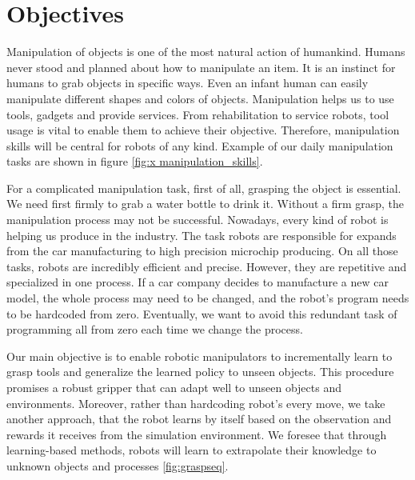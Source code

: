 \section{Objectives}

Manipulation of objects is one of the most natural action of humankind. Humans never stood and planned about how to manipulate an item. It is an instinct for humans to grab objects in specific ways. Even an infant human can easily manipulate different shapes and colors of objects. Manipulation helps us to use tools, gadgets and provide services. From rehabilitation to service robots, tool usage is vital to enable them to achieve their objective.
Therefore, manipulation skills will be central for robots of any kind. 
Example of our daily manipulation tasks are shown in figure \ref{fig:x manipulation_skills}.

For a complicated manipulation task, first of all, grasping the object is essential. We need first firmly to grab a water bottle to drink it.
Without a firm grasp, the manipulation process may not be successful. 
Nowadays, every kind of robot is helping us produce in the industry. The task robots are responsible for expands from the car manufacturing to high precision microchip producing. On all those tasks, robots are incredibly efficient and precise. However, they are repetitive and specialized in one process. If a car company decides to manufacture a new car model, the whole process may need to be changed, and the robot's program needs to be hardcoded from zero. Eventually, we want to avoid this redundant task of programming all from zero each time we change the process.

Our main objective is to enable robotic manipulators to incrementally learn to grasp tools and generalize the learned policy to unseen objects. This procedure promises a robust gripper that can adapt well to unseen objects and environments. Moreover, rather than hardcoding robot's every move, we take another approach, that the robot learns by itself based on the observation and rewards it receives from the simulation environment. We foresee that through learning-based methods, robots will learn to extrapolate their knowledge to unknown objects and processes \ref{fig:graspseq}.


